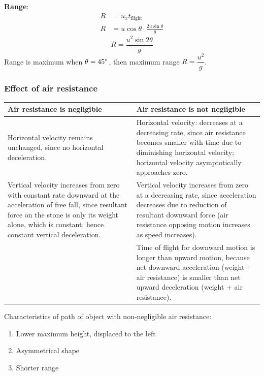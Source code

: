 \textbf{Range}:
\begin{align*}
R &= u_x t_{\text{flight}} \\
R &= u \cos \theta \cdot \frac{2u \sin \theta}{g}
\end{align*}
\[ \boxed{R = \frac{u^2 \sin 2\theta}{g}} \]
Range is maximum when $\theta = 45\degree$, then maximum range $R = \dfrac{u^2}{g}$.
\pagebreak

\subsubsection{Effect of air resistance}
\begin{table}[H]
\centering
\begin{tabular}{p{}p{}}
\hline\hline
Air resistance is negligible & Air resistance is not negligible \\
\hline
Horizontal velocity remains unchanged, since no horizontal deceleration. & Horizontal velocity: decreases at a decreasing rate, since air resistance becomes smaller with time due to diminishing horizontal velocity; horizontal velocity asymptotically approaches zero. \\ 
\hline
Vertical velocity increases from zero with constant rate downward at the acceleration of free fall, since resultant force on the stone is only its weight alone, which is constant, hence constant vertical deceleration. & Vertical velocity increases from zero at a decreasing rate, since acceleration decreases due to reduction of resultant downward force (air resistance opposing motion increases as speed increases). \\
\hline
& Time of flight for downward motion is longer than upward motion, because net downward acceleration (weight - air resistance) is smaller than net upward deceleration (weight + air resistance). \\
\hline\hline
\end{tabular}
\end{table}

Characteristics of path of object with non-negligible air resistance:
\begin{enumerate}
    \item Lower maximum height, displaced to the left
    \item Asymmetrical shape
    \item Shorter range
\end{enumerate}

\begin{figure}[H]
\centering
{}
\end{figure}
\pagebreak

